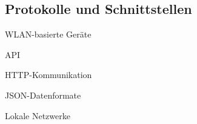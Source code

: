 \subsection{Protokolle und Schnittstellen} 
WLAN-basierte Geräte

API

HTTP-Kommunikation

JSON-Datenformate

Lokale Netzwerke

